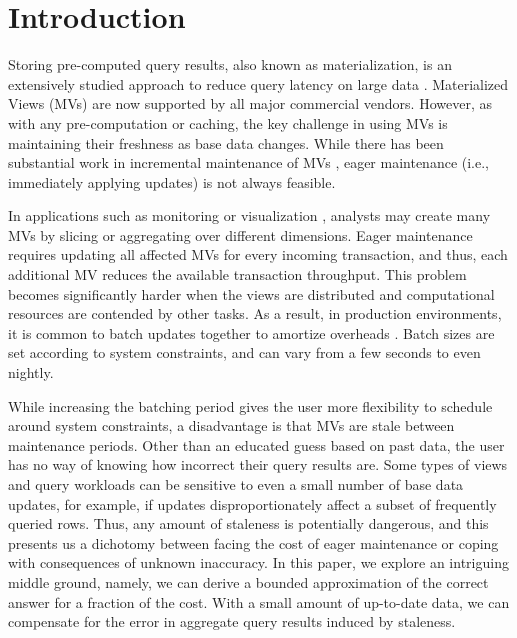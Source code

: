 \vspace{-0.5em}
\section{Introduction}
Storing pre-computed query results, also known as materialization, is an extensively studied approach to reduce query latency on large data \cite{LarsonY85, gupta1995maintenance, chirkova2011materialized}. 
Materialized Views (MVs) are now supported by all major commercial vendors.
However, as with any pre-computation or caching, the key challenge in using MVs is maintaining their freshness as base data changes.
While there has been substantial work in incremental maintenance of MVs \cite{chirkova2011materialized, DBLP:journals/vldb/KochAKNNLS14}, eager maintenance (i.e., immediately applying updates) is not always feasible.

In applications such as monitoring or visualization \cite{rainbird, DBLP:journals/cgf/LiuJH13}, analysts may create many MVs by slicing or aggregating over different dimensions.
Eager maintenance requires updating all affected MVs for every incoming transaction, and thus, each additional MV reduces the available transaction throughput.
This problem becomes significantly harder when the views are distributed and computational resources are contended by other tasks.
As a result, in production environments, it is common to batch updates together to amortize overheads \cite{chirkova2011materialized}.
Batch sizes are set according to system constraints, and can vary from a few seconds to even nightly.  

While increasing the batching period gives the user more flexibility to schedule around system constraints, a disadvantage is that MVs are stale between maintenance periods.
Other than an educated guess based on past data, the user has no way of knowing how incorrect their query results are.
Some types of views and query workloads can be sensitive to even a small number of base data updates, for example, if updates disproportionately affect a subset of frequently queried rows.
Thus, any amount of staleness is potentially dangerous, and this presents us a dichotomy between facing the cost of eager maintenance or coping with consequences of unknown inaccuracy.
In this paper, we explore an intriguing middle ground, namely, we can derive a bounded approximation of the correct answer for a fraction of the cost. 
With a small amount of up-to-date data, we can compensate for the error in aggregate query results induced by staleness.


